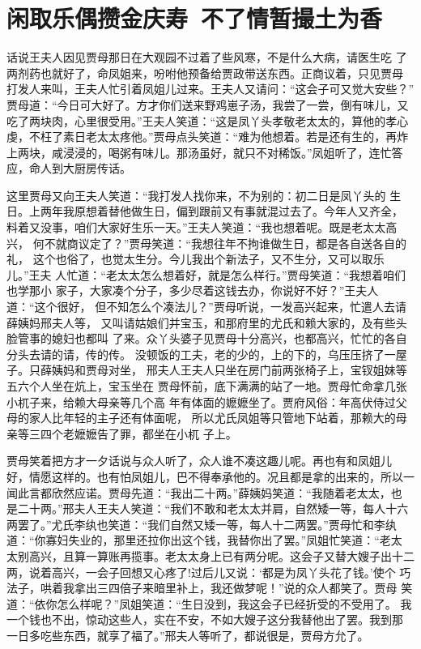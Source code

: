 \chapter{闲取乐偶攒金庆寿~不了情暂撮土为香}

话说王夫人因见贾母那日在大观园不过着了些风寒，不是什么大病，请医生吃
了两剂药也就好了，命凤姐来，吩咐他预备给贾政带送东西。正商议着，只见贾母
打发人来叫，王夫人忙引着凤姐儿过来。王夫人又请问：“这会子可又觉大安些？”
贾母道：“今日可大好了。方才你们送来野鸡崽子汤，我尝了一尝，倒有味儿，又
吃了两块肉，心里很受用。”王夫人笑道：“这是凤丫头孝敬老太太的，算他的孝心
虔，不枉了素日老太太疼他。”贾母点头笑道：“难为他想着。若是还有生的，再炸
上两块，咸浸浸的，喝粥有味儿。那汤虽好，就只不对稀饭。”凤姐听了，连忙答
应，命人到大厨房传话。

这里贾母又向王夫人笑道：“我打发人找你来，不为别的：初二日是凤丫头的
生日。上两年我原想着替他做生日，偏到跟前又有事就混过去了。今年人又齐全，
料着又没事，咱们大家好生乐一天。”王夫人笑道：“我也想着呢。既是老太太高兴，
何不就商议定了？”贾母笑道：“我想往年不拘谁做生日，都是各自送各自的礼，
这个也俗了，也觉太生分。今儿我出个新法子，又不生分，又可以取乐儿。”王夫
人忙道：“老太太怎么想着好，就是怎么样行。”贾母笑道：“我想着咱们也学那小
家子，大家凑个分子，多少尽着这钱去办，你说好不好？”王夫人道：“这个很好，
但不知怎么个凑法儿？”贾母听说，一发高兴起来，忙遣人去请薛姨妈邢夫人等，
又叫请姑娘们并宝玉，和那府里的尤氏和赖大家的，及有些头脸管事的媳妇也都叫
了来。众丫头婆子见贾母十分高兴，也都高兴，忙忙的各自分头去请的请，传的传。
没顿饭的工夫，老的少的，上的下的，乌压压挤了一屋子。只薛姨妈和贾母对坐，
邢夫人王夫人只坐在房门前两张椅子上，宝钗姐妹等五六个人坐在炕上，宝玉坐在
贾母怀前，底下满满的站了一地。贾母忙命拿几张小杌子来，给赖大母亲等几个高
年有体面的嬷嬷坐了。贾府风俗：年高伏侍过父母的家人比年轻的主子还有体面呢，
所以尤氏凤姐等只管地下站着，那赖大的母亲等三四个老嬷嬷告了罪，都坐在小杌
子上。

贾母笑着把方才一夕话说与众人听了，众人谁不凑这趣儿呢。再也有和凤姐儿
好，情愿这样的。也有怕凤姐儿，巴不得奉承他的。况且都是拿的出来的，所以一
闻此言都欣然应诺。贾母先道：“我出二十两。”薛姨妈笑道：“我随着老太太，也
是二十两。”邢夫人王夫人笑道：“我们不敢和老太太并肩，自然矮一等，每人十六
两罢了。”尤氏李纨也笑道：“我们自然又矮一等，每人十二两罢。”贾母忙和李纨
道：“你寡妇失业的，那里还拉你出这个钱，我替你出了罢。”凤姐忙笑道：“老太
太别高兴，且算一算账再揽事。老太太身上已有两分呢。这会子又替大嫂子出十二
两，说着高兴，一会子回想又心疼了!过后儿又说：‘都是为凤丫头花了钱。’使个
巧法子，哄着我拿出三四倍子来暗里补上，我还做梦呢！”说的众人都笑了。贾母
笑道：“依你怎么样呢？”凤姐笑道：“生日没到，我这会子已经折受的不受用了。
我一个钱也不出，惊动这些人，实在不安，不如大嫂子这分我替他出了罢。我到那
一日多吃些东西，就享了福了。”邢夫人等听了，都说很是，贾母方允了。

